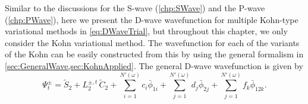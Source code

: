 \documentclass[Dissertation.tex]{subfiles}
\begin{document}
Similar to the discussions for the S-wave (\cref{chp:SWave}) and the P-wave
(\cref{chp:PWave}), here we present the D-wave wavefunction for multiple Kohn-type
variational methods in \cref{eq:DWaveTrial}, but throughout this chapter, we
only consider the Kohn variational method. The wavefunction for each of the 
variants of the Kohn can be easily constructed from this by using the general
formalism in \cref{sec:GeneralWave,sec:KohnApplied}. The general D-wave
wavefunction is given by
\begin{equation}
\Psi_t^\pm = \widetilde{S}_2 + L_2^{\pm,t} \, \widetilde{C}_2 + \sum_{i=1}^{N'(\omega)} c_i \bar{\phi}_{1i} + \sum_{j=1}^{N'(\omega)} d_j \bar{\phi}_{2j} + \sum_{j=1}^{N'(\omega)} f_k \bar{\phi}_{12k}.
\label{eq:DWaveTrial}
\end{equation}
%
\end{document}
